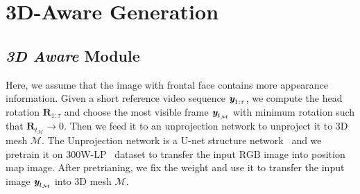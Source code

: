\documentclass[runningheads]{llncs}
\def\mathbi#1{\textbf{\em #1}}
\providecommand{\ytian}[1]{\textcolor{green}{[{\bf #1}]}}
\begin{document}

\section{3D-Aware Generation}
\label{sec:3dgan}
\subsection{\textit{\textbf{3D Aware}} Module}
\label{subsec:3d_man}

{ \indent Here, we assume that the image with frontal face contains more appearance information. Given a short reference video sequence $\mathbi{y}_{1:\tau}$, we compute the head rotation $\mathbf{R}_{1:\tau}$ and choose the most visible frame $\mathbi{y}_{t_{\mathcal{M}}}$ with minimum rotation such that $\mathbf{R}_{t_{\mathcal{M}}} \rightarrow 0$. Then we feed it to an unprojection network to unproject it to 3D mesh $\mathcal{M}$. The Unprojection network is a U-net structure network~\cite{feng2018joint} and we pretrain it on  300W-LP~\cite{zhu2016face} dataset to transfer the input RGB image into position map image. After pretrianing, we fix the weight and use it to transfer the input image $\mathbi{y}_{t_{\mathcal{M}}}$ into 3D mesh $\mathcal{M}$.}
 
\end{document}
